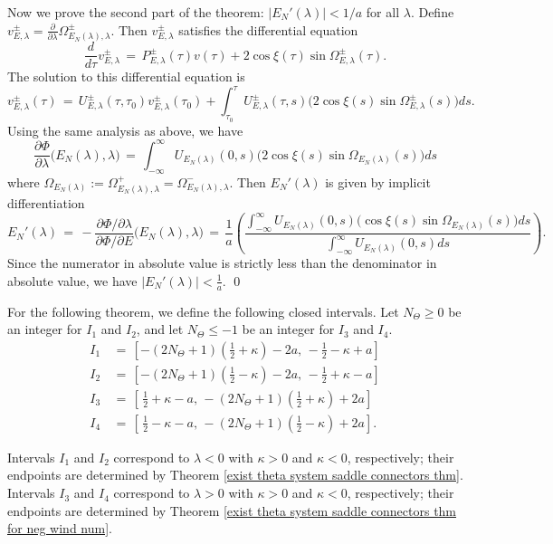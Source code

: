\documentclass[11 pt]{article}
\renewcommand\l{\lambda}
\renewcommand\({\left(}
\renewcommand\){\right)}
\newcommand\<{\langle}
\renewcommand\>{\rangle}
\renewcommand\l{\lambda}
\newcommand\8{\infty}
\newcommand{\pd}{\partial}
\begin{document}
Now we prove the second part of the theorem: $|E_N'(\l)| < 1/a$ for all $\l$. Define $v^\pm_{E,\l} = \frac{\pd }{\pd \l}\Omega^\pm_{E_N(\l), \l}$. Then $v^\pm_{E,\l}$ satisfies the differential equation 
\[
\frac{d}{d\tau}v^\pm_{E,\l} \,=\, P^\pm_{E,\l}(\tau)v(\tau) + 2\cos \xi(\tau) \sin \Omega^\pm_{E,\l}(\tau).
\]
The solution to this differential equation is 
\[
v^\pm_{E,\l}(\tau) \,=\, U^\pm_{E,\l}(\tau,\tau_0)v^\pm_{E,\l}(\tau_0) + \int_{\tau_0}^\tau U^\pm_{E,\l}(\tau,s)\big(2\cos \xi(s) \sin \Omega^\pm_{E,\l}(s)\big)ds. 
\]
Using the same analysis as above, we have
\[
\frac{\pd \Phi}{\pd \l}\big(E_N(\l), \l\big) \,=\, \int_{-\infty}^\infty U_{E_N(\l)}(0,s)\big(2\cos\xi(s) \sin \Omega_{E_N(\l)}(s)\big) ds
\]
where $\Omega_{E_N(\l)} := \Omega^+_{E_N(\l), \l} = \Omega^-_{E_N(\l), \l}$.
Then $E_N'(\l)$ is given by implicit differentiation
\[
E_N'(\l) \,=\, -\frac{\pd \Phi/ \pd \lambda}{\pd \Phi/ \pd E}\big(E_N(\l), \l) \,=\, \frac{1}{a}\left(\frac{\int_{-\infty}^\infty U_{E_N(\l)}(0,s)\big(\cos\xi(s) \sin \Omega_{E_N(\l)}(s)\big) ds}{\int_{-\infty}^\infty U_{E_N(\l)}(0,s)ds}\right).
\]
Since the numerator in absolute value is strictly less than the denominator in absolute value, we have $|E_N'(\l)| < \frac{1}{a}$. \qed 

\medskip
\medskip

For the following theorem, we define the following closed intervals. Let $N_\Theta \geq 0$ be an integer for $I_1$ and $I_2$, and let $N_\Theta \leq -1$ be an integer for $I_3$ and $I_4$.
\medskip
\begin{align*}
I_1 \,&=\, \left[-(2N_\Theta+1)(\frac{1}{2} + \kappa) - 2a,\, -\frac{1}{2} - \kappa + a\right]
\\
I_2 \,&=\, \left[-(2N_\Theta+1)(\frac{1}{2} - \kappa) - 2a,\, -\frac{1}{2} + \kappa - a\right]
\\
I_3 \,&=\, \left[\,\frac{1}{2} + \kappa -a, \, -(2N_\Theta+1)(\frac{1}{2} + \kappa) + 2a\right]
\\
I_4 \,&=\, \left[\,\frac{1}{2} - \kappa-a,\, -(2N_\Theta+1)(\frac{1}{2} - \kappa) + 2a\right].
\end{align*}
\medskip

Intervals $I_1$ and $I_2$ correspond to $\l < 0$ with $\kappa > 0$ and $\kappa < 0$, respectively; their endpoints are determined by Theorem \ref{exist theta system saddle connectors thm}. Intervals $I_3$ and $I_4$ correspond to $\l > 0$ with $\kappa > 0$ and $\kappa < 0$, respectively; their endpoints are determined by Theorem \ref{exist theta system saddle connectors thm for neg wind num}.
\end{document}
